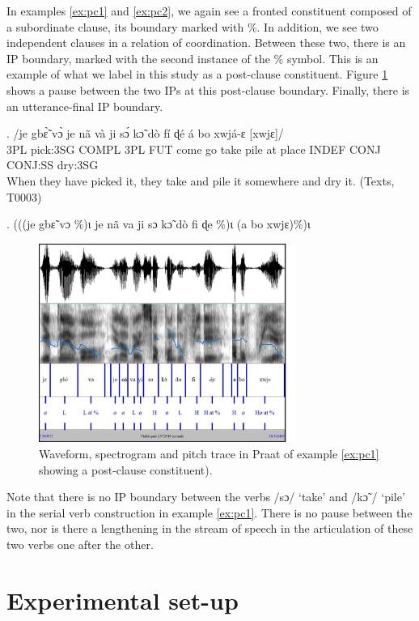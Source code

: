 \documentclass[
  11pt,
  b5paper,
]{article}
\begin{document}
In examples \ref{ex:pc1} and \ref{ex:pc2}, we again see a fronted
constituent composed of a subordinate clause, its boundary marked with
\%. In addition, we see two independent clauses in a relation of
coordination. Between these two, there is an IP boundary, marked with
the second instance of the \% symbol. This is an example of what we
label in this study as a post-clause constituent. Figure \ref{fig:pc1}
shows a pause between the two IPs at this post-clause boundary. Finally,
there is an utterance-final IP boundary.

\exg. \label{ex:pc1}/je gbɛ̃̀ vɔ̀ je nã và ji sɔ́ kɔ̃ dò fí ɖé á bo xwjá-ɛ
{[}xwjɛ{]}/\\
3PL pick:3SG COMPL 3PL FUT come go take pile at place INDEF CONJ CONJ:SS
dry:3SG\\
When they have picked it, they take and pile it somewhere and dry it.
(Texts, T0003)

\ex. \label{ex:pc2}(((je gbɛ̃ vɔ \%)ɩ je nã va ji sɔ kɔ̃ dò fi ɖe \%)ɩ (a
bo xwjɛ)\%)ɩ

\begin{figure}
\centering
\includegraphics[width=0.75\textwidth,height=0.75\textheight]{figure/post-clause-boundary.pdf}
\caption{Waveform, spectrogram and pitch trace in Praat of example
\ref{ex:pc1} showing a post-clause constituent).\label{fig:pc1}}
\end{figure}

Note that there is no IP boundary between the verbs /sɔ/ `take' and /kɔ̃
/ `pile' in the serial verb construction in example \ref{ex:pc1}. There
is no pause between the two, nor is there a lengthening in the stream of
speech in the articulation of these two verbs one after the other.

\hypertarget{experimental-set-up}{%
\section{Experimental set-up}\label{experimental-set-up}}
\end{document}
